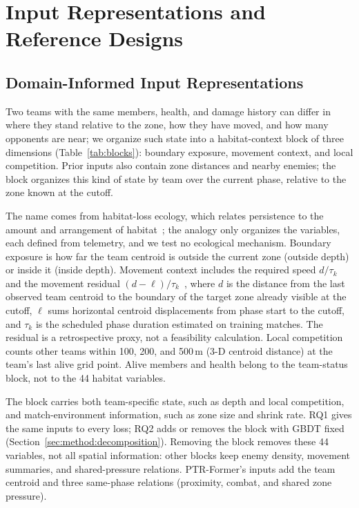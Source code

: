 \documentclass[sigconf,anonymous]{acmart}
\begin{document}
\section{Input Representations and Reference Designs}
\label{sec:method:design}
\subsection{Domain-Informed Input Representations}
\label{sec:method:representation}
Two teams with the same members, health, and damage history can differ in where they stand relative to the zone, how they have moved, and how many opponents are near; we organize such state into a habitat-context block of three dimensions (Table~\ref{tab:blocks}): boundary exposure, movement context, and local competition. Prior inputs also contain zone distances and nearby enemies; the block organizes this kind of state by team over the current phase, relative to the zone known at the cutoff.

The name comes from habitat-loss ecology, which relates persistence to the amount and arrangement of habitat~\cite{Fahrig03}; the analogy only organizes the variables, each defined from telemetry, and we test no ecological mechanism. Boundary exposure is how far the team centroid is outside the current zone (outside depth) or inside it (inside depth). Movement context includes the required speed $d/\tau_k$ and the movement residual $(d-\ell)/\tau_k$~\cite{Nathan08}, where $d$ is the distance from the last observed team centroid to the boundary of the target zone already visible at the cutoff, $\ell$ sums horizontal centroid displacements from phase start to the cutoff, and $\tau_k$ is the scheduled phase duration estimated on training matches. The residual is a retrospective proxy, not a feasibility calculation. Local competition counts other teams within 100, 200, and 500\,m (3-D centroid distance) at the team's last alive grid point. Alive members and health belong to the team-status block, not to the 44 habitat variables.

The block carries both team-specific state, such as depth and local competition, and match-environment information, such as zone size and shrink rate. RQ1 gives the same inputs to every loss; RQ2 adds or removes the block with GBDT fixed (Section~\ref{sec:method:decomposition}). Removing the block removes these 44 variables, not all spatial information: other blocks keep enemy density, movement summaries, and shared-pressure relations. PTR-Former's inputs add the team centroid and three same-phase relations (proximity, combat, and shared zone pressure).
\end{document}
